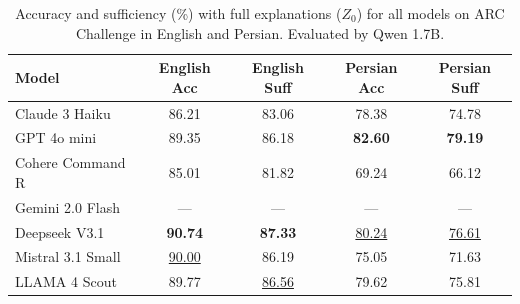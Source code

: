 \begin{table}[t]
\centering
\caption{Accuracy and sufficiency (\%) with full explanations ($Z_0$) for all models on ARC Challenge in English and Persian. Evaluated by Qwen 1.7B.}
\label{tab:overall-z0-qwen-1.7b}
\begin{tabular}{lcccc}
\toprule
\textbf{Model} & \textbf{English Acc} & \textbf{English Suff} & \textbf{Persian Acc} & \textbf{Persian Suff} \\
\midrule
Claude 3 Haiku & 86.21 & 83.06 & 78.38 & 74.78 \\
GPT 4o mini & 89.35 & 86.18 & \textbf{82.60} & \textbf{79.19} \\
Cohere Command R & 85.01 & 81.82 & 69.24 & 66.12 \\
Gemini 2.0 Flash & --- & --- & --- & --- \\
Deepseek V3.1 & \textbf{90.74} & \textbf{87.33} & \underline{80.24} & \underline{76.61} \\
Mistral 3.1 Small & \underline{90.00} & 86.19 & 75.05 & 71.63 \\
LLAMA 4 Scout & 89.77 & \underline{86.56} & 79.62 & 75.81 \\
\bottomrule
\end{tabular}
\end{table}

